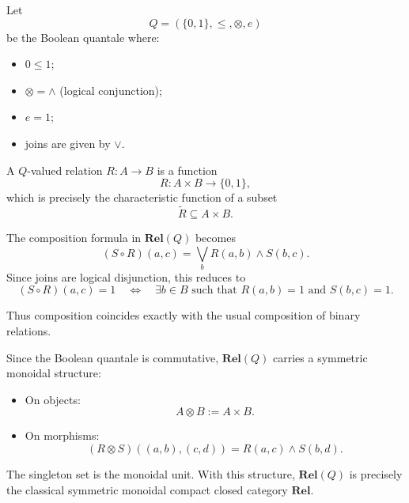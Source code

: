 \begin{example}
	Let
	\[
		Q = (\{0,1\}, \leq, \otimes, e)
	\]
	be the Boolean quantale where:
	\begin{itemize}
		\item $0 \le 1$;
		\item $\otimes = \land$ (logical conjunction);
		\item $e = 1$;
		\item joins are given by $\lor$.
	\end{itemize}

	A $Q$-valued relation $R : A \to B$ is a function
	\[
		R : A \times B \to \{0,1\},
	\]
	which is precisely the characteristic function of a subset
	\[
		\widetilde{R} \subseteq A \times B.
	\]

	The composition formula in $\mathbf{Rel}(Q)$ becomes
	\[
		(S \circ R)(a,c)
		=
		\bigvee_{b} R(a,b) \land S(b,c).
	\]
	Since joins are logical disjunction, this reduces to
	\[
		(S \circ R)(a,c) = 1
		\quad \Longleftrightarrow \quad
		\exists b \in B \text{ such that }
		R(a,b)=1 \text{ and } S(b,c)=1.
	\]

	Thus composition coincides exactly with the usual composition of binary relations.

	Since the Boolean quantale is commutative,
	$\mathbf{Rel}(Q)$ carries a symmetric monoidal structure:

	\begin{itemize}
		\item On objects:
		      \[
			      A \otimes B := A \times B.
		      \]

		\item On morphisms:
		      \[
			      (R \otimes S)((a,b),(c,d))
			      =
			      R(a,c) \land S(b,d).
		      \]
	\end{itemize}

	The singleton set is the monoidal unit.
	With this structure, $\mathbf{Rel}(Q)$ is precisely the classical
	symmetric monoidal compact closed category $\mathbf{Rel}$.

\end{example}
